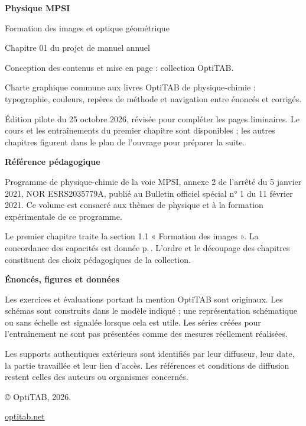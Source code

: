 \thispagestyle{mpsiFront}
\vspace{9mm}
\begin{minipage}{137mm}
\textbf{Physique MPSI}\par
Formation des images et optique géométrique\par
Chapitre 01 du projet de manuel annuel\par
\vspace{3mm}
Conception des contenus et mise en page : collection OptiTAB.\par
Charte graphique commune aux livres OptiTAB de physique-chimie : typographie, couleurs, repères de méthode et navigation entre énoncés et corrigés.\par
\vspace{3mm}
Édition pilote du 25 octobre 2026, révisée pour compléter les pages liminaires. Le cours et les entraînements du premier chapitre sont disponibles ; les autres chapitres figurent dans le plan de l'ouvrage pour préparer la suite.\par
\vspace{3mm}
\textbf{Référence pédagogique}\par
Programme de physique-chimie de la voie MPSI, annexe 2 de l'arrêté du 5 janvier 2021, NOR ESRS2035779A, publié au Bulletin officiel spécial n° 1 du 11 février 2021. Ce volume est consacré aux thèmes de physique et à la formation expérimentale de ce programme.\par
Le premier chapitre traite la section 1.1 « Formation des images ». La concordance des capacités est donnée p.\,\pageref{concordance}. L'ordre et le découpage des chapitres constituent des choix pédagogiques de la collection.\par
\vspace{3mm}
\textbf{Énoncés, figures et données}\par
Les exercices et évaluations portant la mention OptiTAB sont originaux. Les schémas sont construits dans le modèle indiqué ; une représentation schématique ou sans échelle est signalée lorsque cela est utile. Les séries créées pour l'entraînement ne sont pas présentées comme des mesures réellement réalisées.\par
Les supports authentiques extérieurs sont identifiés par leur diffuseur, leur date, la partie travaillée et leur lien d'accès. Les références et conditions de diffusion restent celles des auteurs ou organismes concernés.\par
\vspace{3mm}
© OptiTAB, 2026.\par
\href{https://www.optitab.net}{optitab.net}
\end{minipage}

